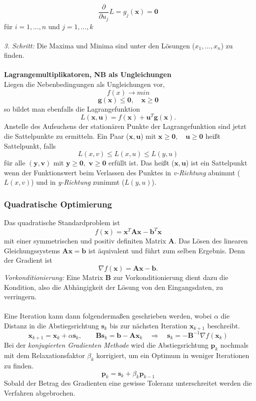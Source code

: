 		\[\frac{\partial}{\partial u_{j}}L = g_{j}(\bm{x}) = \bm{0}\]
		für $ i = 1, ...,n $ und $ j = 1, ...,k $\\\\
		\textit{3. Schritt:} Die Maxima und Minima sind unter den Lösungen ($ x_{1}, ..., x_{n} $) zu finden.
		\leavevmode \\\\
		\textbf{Lagrangemultiplikatoren, NB als Ungleichungen}\\
		Liegen die Nebenbedingungen als Ungleichungen vor,
		\[f(x) \rightarrow min\]
		\[\bm{g(x)} \leq \bm{0}, \quad \bm{x} \geq \bm{0} \]
		so bildet man ebenfalls die Lagrangefunktion
		\[L(\bm{x},\bm{u}) = f(\bm{x}) + \bm{u}^{T}\bm{g}(\bm{x}).\]
		Anstelle des Aufsuchens der stationären Punkte der Lagrangefunktion sind jetzt die Sattelpunkte zu ermitteln. Ein Paar ($ \bm{x,u} $) mit $ \bm{x} \geq \bm{0}, \quad \bm{u} \geq \bm{0} $ heißt Sattelpunkt, falls
		\[L(x,v) \leq L(x,u) \leq L(y,u)\]
		für alle $ (\bm{y,v}) $ mit $ \bm{y} \geq \bm{0}, $  $ \bm{v} \geq \bm{0} $ erfüllt ist. Das heißt ($ \bm{x,u} $) ist ein Sattelpunkt wenn der Funktionswert beim Verlassen des Punktes in \textit{v-Richtung} abnimmt ($ L(x,v) $) und in \textit{y-Richtung} zunimmt ($ L(y,u) $).
		\subsubsection{Quadratische Optimierung}
			Das quadratische Standardproblem ist
			\[f(\bm{x}) = \bm{x}^{T}\bm{Ax} - \bm{b}^{T}\bm{x}\]
			mit einer symmetrischen und positiv definiten Matrix $ \bm{A} $. Das Lösen des linearen Gleichungssystems $ \bm{Ax} = \bm{b} $ ist äquivalent und führt zum selben Ergebnis. Denn der Gradient ist
			\[\nabla f(\bm{x}) = \bm{Ax}-\bm{b}.\]
			\textit{Vorkonditionierung:} Eine Matrix $ \bm{B} $ zur Vorkonditionierung dient dazu die Kondition, also die Abhängigkeit der Lösung von den Eingangsdaten, zu verringern.\\\\
			Eine Iteration kann dann folgendermaßen geschrieben werden, wobei $ \alpha $ die Distanz in die Abstiegsrichtung $ \bm{s}_{k} $ bis zur nächsten Iteration $ \bm{x}_{k+1} $ beschreibt.
			\[\bm{x}_{k+1} = \bm{x}_{k} + \alpha \bm{s}_{k}, \qquad \bm{Bs}_{k} = \bm{b} - \bm{Ax}_{k} \quad \Rightarrow \quad \bm{s}_{k} = -\bm{B}^{-1}\nabla f(\bm{x}_{k}) \]
			Bei der \textit{konjugierten Gradienten Methode} wird die Abstiegsrichtung $ \bm{p}_{k} $ nochmals mit dem Relaxationsfaktor $ \beta_{k} $ korrigiert, um ein Optimum in weniger Iterationen zu finden.
			\[\bm{p}_{k} = \bm{s}_{k} + \beta_{k}\bm{p}_{k-1} \]
			Sobald der Betrag des Gradienten eine gewisse Toleranz unterschreitet werden die Verfahren abgebrochen.
